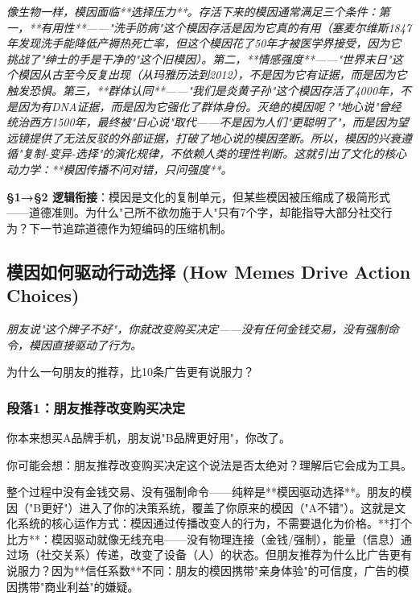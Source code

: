 \documentclass[a4paper,12pt]{book}
\newenvironment{motivation}{\begin{tcolorbox}[colback=gray!10,colframe=gray!60,title=\textit{本章动机 (Motivation)},fonttitle=\bfseries,arc=0mm,leftrule=3mm]\small\itshape}{\end{tcolorbox}}
\newenvironment{questionbox}{\begin{tcolorbox}[colback=red!3!white,colframe=red!60!black]}{\end{tcolorbox}}
\begin{document}
\begin{motivation}
\begin{motivation}
\begin{motivation}
像生物一样，模因面临**选择压力**。存活下来的模因通常满足三个条件：第一，**有用性**——"洗手防病"这个模因存活是因为它真的有用（塞麦尔维斯1847年发现洗手能降低产褥热死亡率，但这个模因花了50年才被医学界接受，因为它挑战了"绅士的手是干净的"这个旧模因）。第二，**情感强度**——"世界末日"这个模因从古至今反复出现（从玛雅历法到2012），不是因为它有证据，而是因为它触发恐惧。第三，**群体认同**——"我们是炎黄子孙"这个模因存活了4000年，不是因为有DNA证据，而是因为它强化了群体身份。灭绝的模因呢？"地心说"曾经统治西方1500年，最终被"日心说"取代——不是因为人们"更聪明了"，而是因为望远镜提供了无法反驳的外部证据，打破了地心说的模因垄断。所以，模因的兴衰遵循"复制-变异-选择"的演化规律，不依赖人类的理性判断。这就引出了文化的核心动力学：**模因传播不问对错，只问强度**。

	\textbf{§1→§2 逻辑衔接}：模因是文化的复制单元，但某些模因被压缩成了极简形式——道德准则。为什么"己所不欲勿施于人"只有7个字，却能指导大部分社交行为？下一节追踪道德作为短编码的压缩机制。

	
	\subsection{模因如何驱动行动选择 (How Memes Drive Action Choices)}
	\begin{motivation}
		朋友说"这个牌子不好"，你就改变购买决定——没有任何金钱交易，没有强制命令，模因直接驱动了行为。
	\end{motivation}
	\begin{questionbox}
		为什么一句朋友的推荐，比10条广告更有说服力？
	\end{questionbox}

	\subsubsection*{段落1：朋友推荐改变购买决定}
	你本来想买A品牌手机，朋友说"B品牌更好用"，你改了。
	\begin{tcolorbox}[colback=yellow!5, title=\textit{读者行为预测}]
		你可能会想：朋友推荐改变购买决定这个说法是否太绝对？理解后它会成为工具。
	\end{tcolorbox}

整个过程中没有金钱交易、没有强制命令——纯粹是**模因驱动选择**。朋友的模因（"B更好"）进入了你的决策系统，覆盖了你原来的模因（"A不错"）。这就是文化系统的核心运作方式：模因通过传播改变人的行为，不需要退化为价格。**打个比方**：模因驱动就像无线充电——没有物理连接（金钱/强制），能量（信息）通过场（社交关系）传递，改变了设备（人）的状态。但朋友推荐为什么比广告更有说服力？因为**信任系数**不同：朋友的模因携带"亲身体验"的可信度，广告的模因携带"商业利益"的嫌疑。


\end{motivation}
\end{motivation}
\end{motivation}
\end{document}
